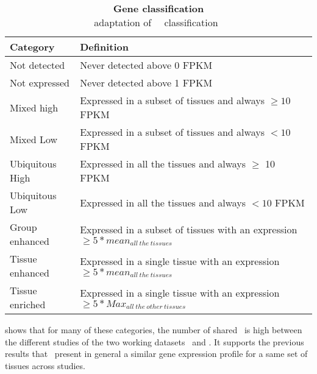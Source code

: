 \begin{table}[!htpb]
\centering
\caption[Gene classification]{\textbf{Gene classification}\label{tab:UhlenCat}\\
\footnotesize{adaptation of \uhlen\ \etal\ classification~}}
\begin{tabular}{@{}ll@{}}
\toprule
Category        & Definition                                                                                           \\ \midrule
Not detected    & Never detected above 0 FPKM                                                                    \\
Not expressed   & Never detected above 1 FPKM                                                                    \\
Mixed high      & Expressed in a subset of tissues and always $\geq 10$ FPKM                                     \\
Mixed Low       & Expressed in a subset of tissues and always $< 10$ FPKM                                 \\
Ubiquitous High & Expressed in all the tissues and always $\geq$ 10 FPKM                                         \\
Ubiquitous Low  & Expressed in all the tissues and always $< 10$ FPKM                                     \\
Group enhanced  & Expressed in a subset of tissues with an expression $\geq 5*mean_{all~the~tissues}$             \\
Tissue enhanced & Expressed in a single tissue with an expression $\geq 5*mean_{all~the~tissues}$                 \\
Tissue enriched & Expressed in a single tissue with an expression $\geq 5*Max_{all~the~other~tissues}$ \\ \bottomrule
\end{tabular}
\end{table}

 shows that for many of these categories,
the number of shared \pcgs\ is high between the different studies of the
two working datasets \setOne\ and \setTwo.
It supports the previous results that \pcgs\ present in general a similar
gene expression profile for a same set of tissues across studies.


